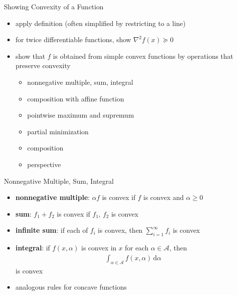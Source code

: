 \documentclass[10pt]{beamer}
\newcommand{\ds}{\displaystyle}
\theoremstyle{definition}
\begin{document}
\begin{frame}{Showing Convexity of a Function}

\begin{itemize}
  \item apply definition (often simplified by restricting to a line)
  \item for twice differentiable functions, show $\ds\nabla^2 f(x)\succcurlyeq 0$
  \item show that $f$ is obtained from simple convex functions by operations that preserve convexity
    \begin{itemize}
      \item nonnegative multiple, sum, integral
      \item composition with affine function
      \item pointwise maximum and supremum
      \item partial minimization
      \item composition
      \item perspective
    \end{itemize}
\end{itemize}

\end{frame}

\begin{frame}{Nonnegative Multiple, Sum, Integral}
\begin{itemize}
  \item {\bf nonnegative multiple}: $\alpha f$ is convex if $f$ is convex and $\alpha\geqslant 0$
  \item {\bf sum}: $f_1 + f_2$ is convex if $f_1$, $f_2$ is convex
  \item {\bf infinite sum}: if each of $\ds f_i$ is convex, then $\ds\sum_{i = 1}^\infty f_i$ is convex
  \item {\bf integral}: if $\ds f(x, \alpha)$ is convex in $x$ for each $\alpha\in\mathcal{A}$, then 
    \begin{align*}
      \int_{\alpha\in\mathcal{A}}f(x,\alpha)\,\text{d}\alpha
    \end{align*} 
    is convex
  \item analogous rules for concave functions
\end{itemize}

\end{frame}
\end{document}
